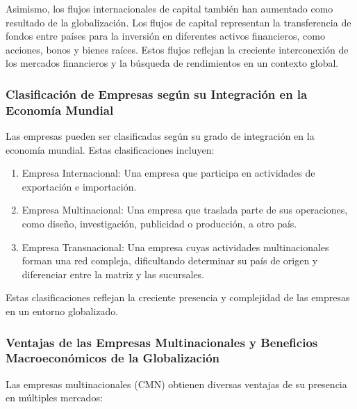 \documentclass[
  letterpaper,
  DIV=11,
  numbers=noendperiod]{scrartcl}
\providecommand{\tightlist}{%
  \setlength{\itemsep}{0pt}\setlength{\parskip}{0pt}}\usepackage{longtable,booktabs,array}
\begin{document}
Asimismo, los flujos internacionales de capital también han aumentado
como resultado de la globalización. Los flujos de capital representan la
transferencia de fondos entre países para la inversión en diferentes
activos financieros, como acciones, bonos y bienes raíces. Estos flujos
reflejan la creciente interconexión de los mercados financieros y la
búsqueda de rendimientos en un contexto global.

\hypertarget{clasificaciuxf3n-de-empresas-seguxfan-su-integraciuxf3n-en-la-economuxeda-mundial}{%
\subsubsection{Clasificación de Empresas según su Integración en la
Economía
Mundial}\label{clasificaciuxf3n-de-empresas-seguxfan-su-integraciuxf3n-en-la-economuxeda-mundial}}

Las empresas pueden ser clasificadas según su grado de integración en la
economía mundial. Estas clasificaciones incluyen:

\begin{enumerate}
\def\labelenumi{\arabic{enumi}.}
\tightlist
\item
  Empresa Internacional: Una empresa que participa en actividades de
  exportación e importación.
\item
  Empresa Multinacional: Una empresa que traslada parte de sus
  operaciones, como diseño, investigación, publicidad o producción, a
  otro país.
\item
  Empresa Transnacional: Una empresa cuyas actividades multinacionales
  forman una red compleja, dificultando determinar su país de origen y
  diferenciar entre la matriz y las sucursales.
\end{enumerate}

Estas clasificaciones reflejan la creciente presencia y complejidad de
las empresas en un entorno globalizado.

\hypertarget{ventajas-de-las-empresas-multinacionales-y-beneficios-macroeconuxf3micos-de-la-globalizaciuxf3n}{%
\subsubsection{Ventajas de las Empresas Multinacionales y Beneficios
Macroeconómicos de la
Globalización}\label{ventajas-de-las-empresas-multinacionales-y-beneficios-macroeconuxf3micos-de-la-globalizaciuxf3n}}

Las empresas multinacionales (CMN) obtienen diversas ventajas de su
presencia en múltiples mercados:
\end{document}
